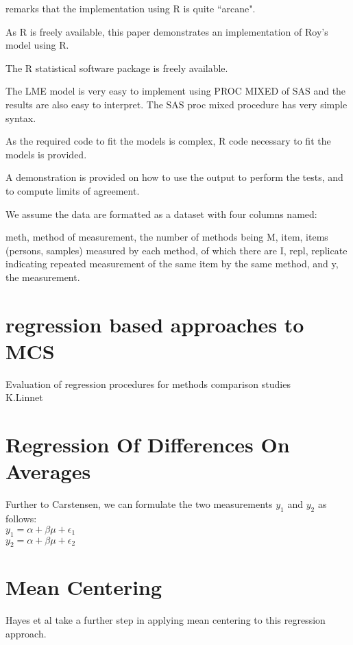 \documentclass[12pt, a4paper]{article}
\theoremstyle{plain}
\theoremstyle{definition}
\theoremstyle{remark}
\begin{document}
\citet{BXC2008} remarks that the implementation using R is quite ``arcane".

As R is freely available, this paper demonstrates an implementation of Roy's model using R.

The R statistical software package is freely available.

The LME model is very easy to implement using PROC MIXED of SAS and the results are also easy to interpret.
The SAS proc mixed procedure has very simple syntax.

As the required code to fit the models is complex, R code necessary to fit the models is provided. 

A demonstration is provided on how to use the output to perform the tests, and to compute limits of agreement.



We assume the data are formatted as a dataset with four columns named:

	meth, method of measurement, the number of methods being M,
	item, items (persons, samples) measured by each method, of which there are I,
	repl, replicate indicating repeated measurement of the same item by the same method, and
	y, the measurement.





\newpage
\section{regression based approaches to MCS}

Evaluation of regression procedures for methods comparison studies
\\
K.Linnet

\section{Regression Of Differences On Averages}
Further to Carstensen, we can formulate the two measurements
$y_{1}$ and $y_{2}$ as follows:
\\
$y_{1} = \alpha + \beta\mu + \epsilon_{1}$
\\
$y_{2} = \alpha + \beta\mu + \epsilon_{2}$

\section{Mean Centering}
Hayes et al take a further step in applying mean centering to this
regression approach.
\end{document}
